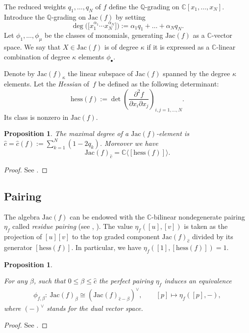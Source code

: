 \documentclass[10pt,a4paper]{amsart}
\numberwithin{equation}{section}
\newtheorem{Proposition}[Theorem]{Proposition}
 { \theoremstyle{definition}
\newtheorem{Definition}[Theorem]{Definition}
\newtheorem{Note}[Theorem]{Note}
\newtheorem{Example}[Theorem]{Example}
\newtheorem{Remark}[Theorem]{Remark} }
\newcommand{\CC}{{\mathbb{C}}}
\newcommand{\QQ}{{\mathbb{Q}}}
\newcommand{\Jac}{\mathrm{Jac}}
\newcommand{\hess}{\mathrm{hess}}
\begin{document}
The reduced weights $q_1,\dots,q_N$ of $f$ define the $\QQ$-grading on $\CC[x_1,\dots,x_N]$.
Introduce the $\QQ$-grading on $\Jac(f)$ by setting
\[
	\deg\bigl(\bigl[x_1^{\alpha_1}\cdots x_N^{\alpha_N}\bigr]\bigr) := \alpha_1q_1 + \dots + \alpha_Nq_N.
\]
Let $\phi_1,\dots,\phi_\mu$ be the classes of monomials, generating $\Jac(f)$ as a $\CC$-vector space.
We say that $X \in \Jac(f)$ is of degree $\kappa$ if it is expressed as a $\CC$-linear combination of degree $\kappa$ elements $\phi_\bullet$.

Denote by $\Jac(f)_\kappa$ the linear subspace of $\Jac(f)$ spanned by the degree $\kappa$ elements. Let the {\em Hessian} of~$f$ be defined as the following determinant:
\begin{equation*}
\hess(f):=\det \left(\frac{\partial^2 f}{\partial x_{i} \partial x_{j}}\right)_{i,j=1,\dots,N}.
\end{equation*}
Its class is nonzero in $\Jac(f)$.

\begin{Proposition}\label{prop: top degree}
	The maximal degree of a $\Jac(f)$-element is ${\widehat c}={\widehat c}(f) := \sum_{k=1}^N (1 - 2 q_k)$. Moreover we have
	\[
		\Jac(f)_{\widehat c} = \CC \langle [\hess(f)] \rangle.
	\]
\end{Proposition}
\begin{proof}
 See \cite[Section II]{AGV85}.
\end{proof}

\subsection{Pairing}
The algebra $\Jac(f)$ can be endowed with the $\CC$-bilinear nondegenerate pairing $\eta_f$ called \textit{residue pairing} (see \cite[Chapter~5]{GH94}, \cite[Section~5.11]{AGV85}).
The value $\eta_f([u],[v])$ is taken as the projection of $[u][v]$ to the top graded component $\Jac(f)_{\widehat c}$ divided by its generator $[\hess(f)]$. In particular, we have $\eta_f([1],[\hess(f)]) = 1$.

\begin{Proposition}\label{prop: grading of Jac(f)}

For any $\beta$, such that $0 \le \beta \le {\widehat c}$ the perfect pairing $\eta_f$ induces an equivalence
\begin{gather*}
\phi_{f,\beta}\colon\ \Jac(f)_{\beta} \cong (\Jac(f)_{{\widehat c} - \beta})^\vee,\qquad
[p]\mapsto \eta_f([p],-),
\end{gather*}
where $(-)^\vee$ stands for the dual vector space.
\end{Proposition}
\begin{proof}
 See \cite[Section II]{AGV85}.
\end{proof}
\end{document}
